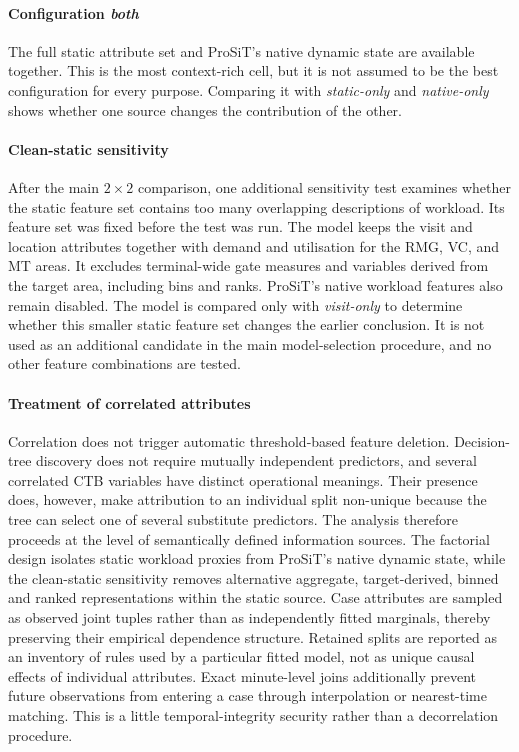 \paragraph{Configuration \textit{both}}
\label{sec:cfg_workload}

The full static attribute set and ProSiT's native dynamic state are available
together. This is the most context-rich cell, but it is not assumed to be the
best configuration for every purpose. Comparing it with \textit{static-only} and \textit{native-only}
shows whether one source changes the contribution of the other.

\paragraph{Clean-static sensitivity}

After the main $2\times2$ comparison, one additional sensitivity test examines
whether the static feature set contains too many overlapping descriptions of
workload. Its feature set was fixed before the test was run. The model keeps
the visit and location attributes together with demand and utilisation for the
RMG, VC, and MT areas. It excludes terminal-wide gate measures and variables
derived from the target area, including bins and ranks. ProSiT's native
workload features also remain disabled. The model is compared only with
\textit{visit-only} to determine whether this smaller static feature set changes
the earlier conclusion. It is not used as an additional candidate in the main
model-selection procedure, and no other feature combinations are tested.

\paragraph{Treatment of correlated attributes}

Correlation does not trigger automatic threshold-based feature deletion.
Decision-tree discovery does not require mutually independent predictors, and
several correlated CTB variables have distinct operational meanings. Their
presence does, however, make attribution to an individual split non-unique
because the tree can select one of several substitute predictors. The analysis
therefore proceeds at the level of semantically defined information sources.
The factorial design isolates static workload proxies from ProSiT's native
dynamic state, while the clean-static sensitivity removes alternative
aggregate, target-derived, binned and ranked representations within the static
source. Case attributes are sampled as observed joint tuples rather than as
independently fitted marginals, thereby preserving their empirical dependence
structure. Retained splits are reported as an inventory of rules used by a
particular fitted model, not as unique causal effects of individual
attributes. Exact minute-level joins additionally prevent future observations
from entering a case through interpolation or nearest-time matching. This is a little
temporal-integrity security rather than a decorrelation procedure.

